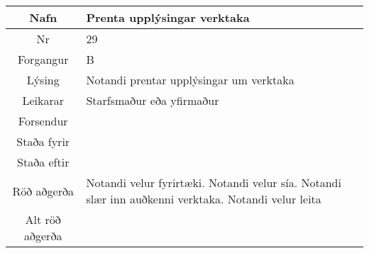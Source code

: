 \documentclass[a4paper]{article}
\begin{document}
\begin{tabular}{|c|p{10cm}|}
\hline
Nafn&Prenta upplýsingar verktaka\\
\hline
Nr&29\\
\hline
Forgangur&B\\
\hline
Lýsing&Notandi prentar upplýsingar um verktaka\\
\hline
Leikarar&Starfsmaður eða yfirmaður\\
\hline
Forsendur&\\
\hline
Staða fyrir&\\
\hline
Staða eftir&\\
\hline
Röð aðgerða&Notandi velur fyrirtæki. Notandi velur sía. Notandi slær inn auðkenni verktaka. Notandi velur leita\\
\hline
Alt röð aðgerða&\\
\hline
\end{tabular}
\end{document}
